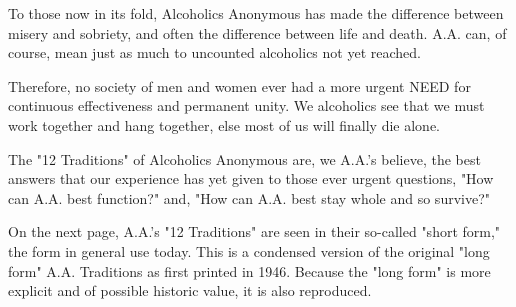 

\begin{biblechapter}
    To those now in its fold, 
    Alcoholics Anonymous has made the difference 
    between misery and sobriety, 
    and often the difference between life and death. 
\verse A.A. can, of course, 
    mean just as much to uncounted alcoholics not yet reached.
  
\verse Therefore, no society of men and women 
    ever had a more urgent NEED for continuous effectiveness 
    and permanent unity.
\verse We alcoholics see that we must work together and hang together, 
    else most of us will finally die alone.

\verse The "12 Traditions" of Alcoholics Anonymous are, 
    we A.A.'s believe, 
    the best answers that our experience has yet given 
    to those ever urgent questions, 
    "How can A.A. best function?" 
    and, "How can A.A. best stay whole 
    and so survive?"
  
\verse On the next page, 
    A.A.'s "12 Traditions" are seen in their so-called "short form," 
    the form in general use today.
\verse This is a condensed version of the original 
    "long form" A.A. Traditions as first printed in 1946.
\verse Because the "long form" is more explicit 
    and of possible historic value, it is also reproduced.
\end{biblechapter}

